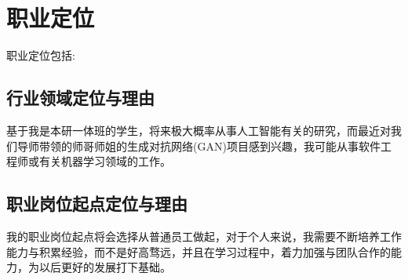\documentclass{article}
\begin{document}
\section{职业定位}
\par
职业定位包括:\par

\subsection{行业领域定位与理由}
基于我是本研一体班的学生，将来极大概率从事人工智能有关的研究，而最近对我们导师带领的师哥师姐的生成对抗网络(GAN)项目感到兴趣，我可能从事软件工程师或有关机器学习领域的工作。\par
\subsection{职业岗位起点定位与理由}
我的职业岗位起点将会选择从普通员工做起，对于个人来说，我需要不断培养工作能力与积累经验，而不是好高骛远，并且在学习过程中，着力加强与团队合作的能力，为以后更好的发展打下基础。\par
\end{document}
